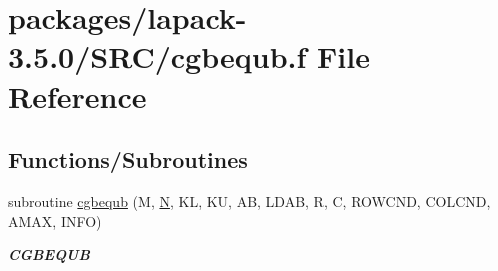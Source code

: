 \hypertarget{cgbequb_8f}{}\section{packages/lapack-\/3.5.0/\+S\+R\+C/cgbequb.f File Reference}
\label{cgbequb_8f}
\subsection*{Functions/\+Subroutines}
\begin{DoxyCompactItemize}
\item 
subroutine \hyperlink{group__complexGBcomputational_gadf6ae8f6ca7b854969089121b696eb14}{cgbequb} (M, \hyperlink{polmisc_8c_a0240ac851181b84ac374872dc5434ee4}{N}, K\+L, K\+U, A\+B, L\+D\+A\+B, R, C, R\+O\+W\+C\+N\+D, C\+O\+L\+C\+N\+D, A\+M\+A\+X, I\+N\+F\+O)
\begin{DoxyCompactList}\small\item\em {\bfseries C\+G\+B\+E\+Q\+U\+B} \end{DoxyCompactList}\end{DoxyCompactItemize}

